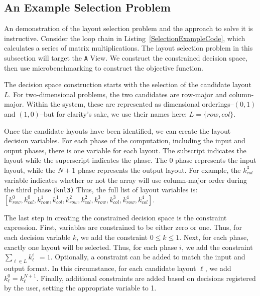 \subsection{An Example Selection Problem}

An demonstration of the layout selection problem and the approach to solve it is instructive.
Consider the loop chain in Listing~\ref{SelectionExampleCode}, which calculates a series of matrix multiplications.
The layout selection problem in this subsection will target the \verb.A. View.
We construct the constrained decision space, then use microbenchmarking to construct the objective function.

The decision space construction starts with the selection of the candidate layout $L$.
For two-dimensional problems, the two candidates are row-major and column-major.
Within the system, these are represented as dimensional orderings--$(0,1)$ and $(1,0)$--but for clarity's sake, we use their names here: $L=\{row,col\}$.

Once the candidate layouts have been identified, we can create the layout decision variables.
For each phase of the computation, including the input and ouput phases, there is one variable for each layout.
The subscript indicates the layout while the superscript indicates the phase. 
The 0 phase represents the input layout, while the $N+1$ phase represents the output layout.
For example, the $k_{col}^{3}$ variable indicates whether or not the array will use column-major order during the third phase (\verb.knl3).
Thus, the full list of layout variables is: $[k_{row}^{0}, k_{col}^{0}, k_{row}^{1}, k_{col}^{1},k_{row}^{2}, k_{col}^{2},k_{row}^{3}, k_{col}^{3},k_{row}^{4}, k_{col}^{4}]$.

The last step in creating the constrained decision space is the constraint expression. 
First, variables are constrained to be either zero or one. 
Thus, for each decision variable $k$, we add the constraint $0 \leq k \leq 1$.
Next, for each phase, exactly one layout will be selected. 
Thus, for each phase $i$, we add the constraint $\sum_{\ell \in L} k_\ell^{i} \ \ = 1$.
Optionally, a constraint can be added to match the input and output format.
In this circumstance, for each candidate layout $\ell$, we add $k_\ell^{0} = k_\ell^{N+1}$.
Finally, additional constraints are added based on decisions registered by the user, setting the appropriate variable to 1.

